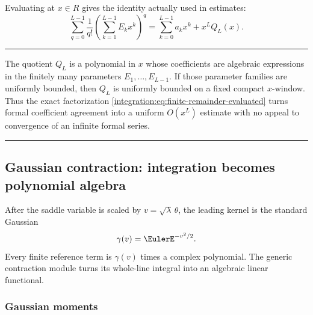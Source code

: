 \documentclass[11pt,oneside]{article}
\theoremstyle{definition}
\theoremstyle{remark}
\newenvironment{boxedremark}{%
  \par\smallskip\noindent\begin{center}\begin{minipage}{0.94\textwidth}%
  \color{black}\hrule\vspace{0.6em}\small
}{%
  \vspace{0.6em}\hrule\end{minipage}\end{center}\smallskip
}
\begin{document}
Evaluating at $x\in R$ gives the identity actually used in estimates:
\begin{equation}
 \sum_{q=0}^{L-1}\frac1{q!}
 \left(\sum_{k=1}^{L-1}E_kx^k\right)^q
 =\sum_{k=0}^{L-1}a_kx^k+x^LQ_L(x).
 \label{integration:eq:finite-remainder-evaluated}
\end{equation}

\begin{boxedremark}
The quotient $Q_L$ is a polynomial in $x$ whose coefficients are algebraic expressions in
the finitely many parameters $E_1,\ldots,E_{L-1}$.  If those parameter families are uniformly
bounded, then $Q_L$ is uniformly bounded on a fixed compact $x$-window.  Thus the exact
factorization \eqref{integration:eq:finite-remainder-evaluated} turns formal coefficient agreement into a
uniform $O(x^L)$ estimate with no appeal to convergence of an infinite formal series.
\end{boxedremark}

\subsection{Gaussian contraction: integration becomes polynomial algebra}
\label{integration:sec:gaussian-contraction}

After the saddle variable is scaled by $v=\sqrt{\lambda}\,\theta$, the leading kernel is the
standard Gaussian
\begin{equation}
 \gamma(v)=\EulerE^{-v^2/2}.
 \label{integration:eq:standard-gaussian-kernel}
\end{equation}
Every finite reference term is $\gamma(v)$ times a complex polynomial.  The generic
contraction module turns its whole-line integral into an algebraic linear functional.

\subsubsection{Gaussian moments}
\end{document}
